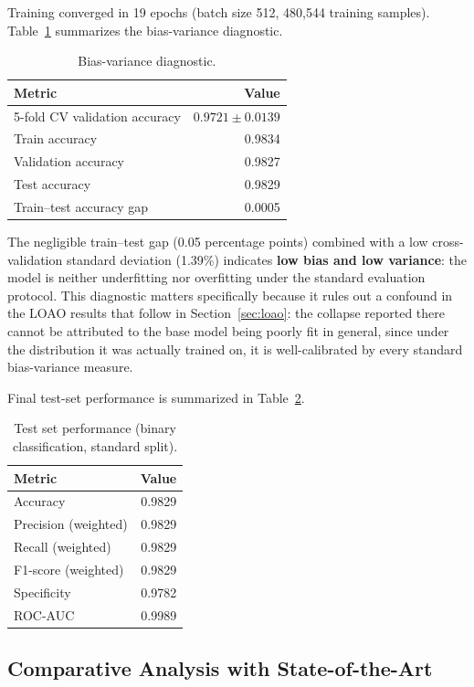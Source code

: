 \documentclass[11pt]{article}
\begin{document}
Training converged in 19 epochs (batch size 512, 480{,}544 training samples). Table~\ref{tab:biasvar}
summarizes the bias-variance diagnostic.

\begin{table}[h]
\centering
\caption{Bias-variance diagnostic.}
\label{tab:biasvar}
\begin{tabular}{lr}
\toprule
Metric & Value \\
\midrule
5-fold CV validation accuracy & $0.9721 \pm 0.0139$ \\
Train accuracy & 0.9834 \\
Validation accuracy & 0.9827 \\
Test accuracy & 0.9829 \\
Train--test accuracy gap & 0.0005 \\
\bottomrule
\end{tabular}
\end{table}

The negligible train--test gap (0.05 percentage points) combined with a low cross-validation
standard deviation (1.39\%) indicates \textbf{low bias and low variance}: the model is neither
underfitting nor overfitting under the standard evaluation protocol. This diagnostic matters
specifically because it rules out a confound in the LOAO results that follow in
Section~\ref{sec:loao}: the collapse reported there cannot be attributed to the base model being
poorly fit in general, since under the distribution it was actually trained on, it is well-calibrated
by every standard bias-variance measure.

Final test-set performance is summarized in Table~\ref{tab:testresults}.

\begin{table}[h]
\centering
\caption{Test set performance (binary classification, standard split).}
\label{tab:testresults}
\begin{tabular}{lr}
\toprule
Metric & Value \\
\midrule
Accuracy & 0.9829 \\
Precision (weighted) & 0.9829 \\
Recall (weighted) & 0.9829 \\
F1-score (weighted) & 0.9829 \\
Specificity & 0.9782 \\
ROC-AUC & 0.9989 \\
\bottomrule
\end{tabular}
\end{table}

\subsection{Comparative Analysis with State-of-the-Art}
\label{sec:sota}
\end{document}
